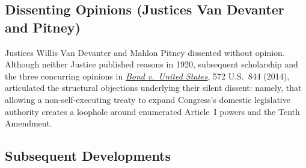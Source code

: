 \documentclass[12pt]{article}
\begin{document}
\begin{itemize}
\end{itemize}

\subsection{Dissenting Opinions (Justices Van Devanter and Pitney)}

Justices Willis Van Devanter and Mahlon Pitney dissented without opinion. Although neither Justice published reasons in 1920, subsequent scholarship and the three concurring opinions in \href{https://supreme.justia.com/cases/federal/us/572/844/}{\textit{Bond v.\ United States}}, 572 U.S.\ 844 (2014), articulated the structural objections underlying their silent dissent: namely, that allowing a non-self-executing treaty to expand Congress's domestic legislative authority creates a loophole around enumerated Article~I powers and the Tenth Amendment.

\subsection{Subsequent Developments}
\end{document}
